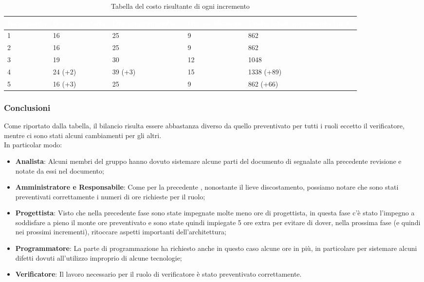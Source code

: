 {
\renewcommand{\arraystretch}{1.65}
\centering
\begin{longtable}{ C{2.1cm} C{2.7cm} C{3cm} C{3cm} C{3.3cm} }
\caption{Tabella del costo risultante di ogni incremento}\\
\textcolor{white}{\textbf{Incremento}} & 
\textcolor{white}{\textbf{Ore progettista}} &
\textcolor{white}{\textbf{Ore programmatore}}&
\textcolor{white}{\textbf{Ore verificatore}}&
\textcolor{white}{\textbf{Costo totale incremento (in \euro{})}}\\
\endhead

1 & 16      & 25      &  9 &  862       \\
2 & 16      & 25      &  9 &  862       \\
3 & 19      & 30      & 12 & 1048       \\
4 & 24 (+2) & 39 (+3) & 15 & 1338 (+89) \\
5 & 16 (+3) & 25      &  9 &  862 (+66) \\

\end{longtable}
}

\subsubsection{Conclusioni}
Come riportato dalla tabella, il bilancio risulta essere abbastanza diverso da quello preventivato per tutti i ruoli eccetto il verificatore, mentre ci sono stati alcuni cambiamenti per gli altri. \\
In particolar modo:
\begin{itemize}
    \item \textbf{Analista}: Alcuni membri del gruppo hanno dovuto sistemare alcune parti del documento di \AdR{} segnalate alla precedente revisione e notate da essi nel documento;
	\item \textbf{Amministratore e Responsabile}: Come per la precedente , nonostante il lieve discostamento, possiamo notare che sono stati preventivati correttamente i numeri di ore richieste per il ruolo;
    \item \textbf{Progettista}: Visto che nella precedente fase sono state impegnate molte meno ore di progettista, in questa fase c'è stato l'impegno a soddisfare a pieno il monte ore preventivato e sono state quindi impiegate 5 ore extra per evitare di dover, nella prossima fase (e quindi nei prossimi incrementi), ritoccare aspetti importanti dell'architettura;
    \item \textbf{Programmatore}: La parte di programmazione ha richiesto anche in questo caso alcune ore in più, in particolare per sistemare alcuni difetti dovuti all'utilizzo improprio di alcune tecnologie;
	\item \textbf{Verificatore}: Il lavoro necessario per il ruolo di verificatore è stato preventivato correttamente. 
\end{itemize}

